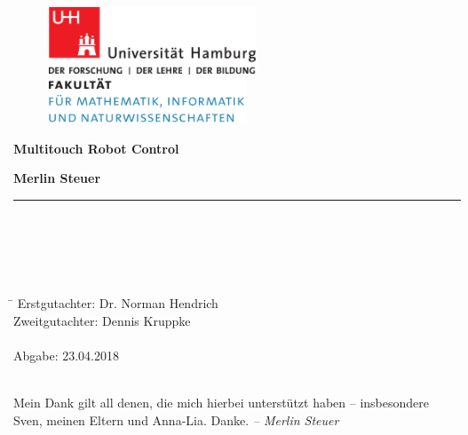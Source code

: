 \begin{titlepage}

  \setcounter{page}{-1}

	\begin{figure}[h]
		\begin{minipage}[b]{62mm}
			\includegraphics[width=62mm]{images/unilogo}
		\end{minipage}
		\hspace{4cm}
		\begin{minipage}[b]{59mm}
			\includegraphics[width=59mm]{images/minlogo}
		\end{minipage}
	\end{figure}

	\vfill
	
	\begin{center}
		\vspace{14mm}
		\noindent \textbf{\huge
		  Multitouch Robot Control \\
		}
		\vspace{60mm}	
	\end{center}
	
	\vfill
	
	\noindent \textbf{Merlin Steuer} \\
	\noindent \rule{\textwidth}{0.4mm} 
	 \\
	 \\
	 \\
	 \\
	\begin{tabbing}
	\hspace{8em} \=  \kill
	Erstgutachter: \> Dr. Norman Hendrich \\
	Zweitgutachter: \> Dennis Kruppke \\
	~ \\
	Abgabe: 23.04.2018
	\end{tabbing}
	
	\newpage 
	\thispagestyle{empty}
	\setcounter{page}{0}

	~\\ \vfill \noindent 
	Mein Dank gilt all denen, die mich hierbei unterstützt haben -- insbesondere Sven, meinen Eltern und Anna-Lia. Danke.
	\textit{-- Merlin Steuer}
\end{titlepage}

